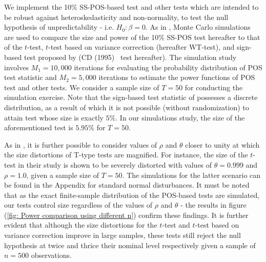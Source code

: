 \documentclass[harvard,11pt]{article}
\begin{document}
We implement the 10\% SS-POS-based test and other tests which are intended to be robust against
heteroskedasticity and non-normality, to test the null hypothesis of unpredictability - i.e. $%
H_{0}:\beta =0.$ As in \citet{dufour2010exact}, Monte Carlo simulations are used to compare the size and
power of the 10\% SS-POS test hereafter to that of the $t$-test, $t$-test
based on \citet{white1980heteroskedasticity} variance correction (hereafter WT-test), and
sign-based test proposed by 
\citet{dufour1995exact} (CD (1995)%
\textit{\ }test hereafter). The simulation study involves $M_{1}=10,000$ iterations for evaluating the
probability distribution of POS test statistic and $M_{2}=5,000$ iterations
to estimate the power functions of POS test and other tests. We consider a sample size of $T=50$ for conducting the simulation exercise. 
Note that the sign-based test statistic of \citet{dufour1995exact} possesses a discrete distribution, as a result of which it is not possible
(without randomization) to attain test whose size is exactly $5\%.$ In our
simulations study, the size of the aforementioned test is $5.95\%$ for $T=50$.

As in \citet{mankiw1986we}, it is further possible to consider values of $\rho$ and $\theta$ closer to unity at which the size distortions of T-type tests are magnified. For instance, the size of the $t$-test in their study is shown to be severely distorted with values of $\theta=0.999$ and $\rho=1.0$, given a sample size of $T=50$. The simulations for the latter scenario can be found in the Appendix for standard normal disturbances. It must be noted that as the exact finite-sample distribution of the POS-based tests are simulated, our tests control size regardless of the values of $\rho$ and $\theta$ - the results in figure (\ref{fig: Power comparison using different n}) confirm these findings. It is further evident that although the size distortions for the $t$-test and $t$-test based on \citet{white1980heteroskedasticity} variance correction improve in large samples, these tests still reject the null hypothesis at twice and thrice their nominal level respectively given a sample of $n=500$ observations.
\end{document}
